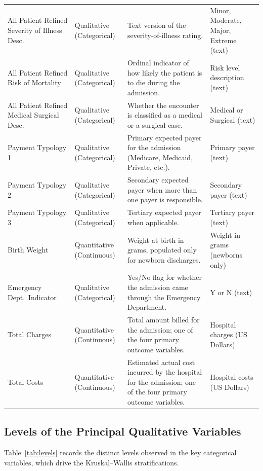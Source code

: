 \documentclass[12pt]{article}
\begin{document}
\begin{longtable}{p{} p{} p{} p{}}
All Patient Refined Severity of Illness Desc.\ & Qualitative (Categorical) & Text version of the severity-of-illness rating. & Minor, Moderate, Major, Extreme (text) \\
All Patient Refined Risk of Mortality & Qualitative (Categorical) & Ordinal indicator of how likely the patient is to die during the admission. & Risk level description (text) \\
All Patient Refined Medical Surgical Desc.\ & Qualitative (Categorical) & Whether the encounter is classified as a medical or a surgical case. & Medical or Surgical (text) \\
Payment Typology 1 & Qualitative (Categorical) & Primary expected payer for the admission (Medicare, Medicaid, Private, etc.). & Primary payer (text) \\
Payment Typology 2 & Qualitative (Categorical) & Secondary expected payer when more than one payer is responsible. & Secondary payer (text) \\
Payment Typology 3 & Qualitative (Categorical) & Tertiary expected payer when applicable. & Tertiary payer (text) \\
Birth Weight & Quantitative (Continuous) & Weight at birth in grams, populated only for newborn discharges. & Weight in grams (newborns only) \\
Emergency Dept.\ Indicator & Qualitative (Categorical) & Yes/No flag for whether the admission came through the Emergency Department. & Y or N (text) \\
Total Charges & Quantitative (Continuous) & Total amount billed for the admission; one of the four primary outcome variables. & Hospital charges (US Dollars) \\
Total Costs & Quantitative (Continuous) & Estimated actual cost incurred by the hospital for the admission; one of the four primary outcome variables. & Hospital costs (US Dollars) \\
\bottomrule
\end{longtable}

\subsection{Levels of the Principal Qualitative Variables}

Table~\ref{tab:levels} records the distinct levels observed in the key
categorical variables, which drive the Kruskal--Wallis
stratifications.
\end{document}
